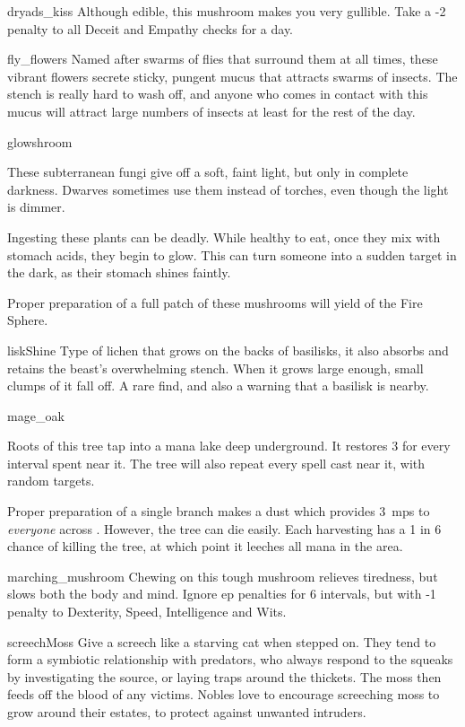 \begin{multicols}{2}
%
  {dryads_kiss}%
  {Although edible, this mushroom makes you very gullible.
  Take a -2 penalty to all Deceit and Empathy checks for a day.}%

%
  {fly_flowers}%
  {Named after swarms of flies that surround them at all times, these vibrant flowers secrete sticky, pungent mucus that attracts swarms of insects.
  The stench is really hard to wash off, and anyone who comes in contact with this mucus will attract large numbers of insects at least for the rest of the day.}%

%
  {glowshroom}%
  {These subterranean fungi give off a soft, faint light, but only in complete darkness.
   Dwarves sometimes use them instead of torches, even though the light is dimmer.

   Ingesting these plants can be deadly.
   While healthy to eat, once they mix with stomach acids, they begin to glow.
   This can turn someone into a sudden target in the dark, as their stomach shines faintly.

   Proper preparation of a full patch of these mushrooms will yield  of the Fire Sphere.
    }

%
  {liskShine}%
  {Type of lichen that grows on the backs of basilisks, it also absorbs and retains the beast's overwhelming stench.
  When it grows large enough, small clumps of it fall off.
  A rare find, and also a warning that a basilisk is nearby.
    }

%
  {mage_oak}%
  {
    Roots of this tree tap into a mana lake deep underground.
    It restores 3  for every \gls{interval} spent near it.
    The tree will also repeat every spell cast near it, with random targets.

    Proper preparation of a single branch makes a dust which provides 3~\glspl{mp} to \emph{everyone} across .
    However, the tree can die easily.
    Each harvesting has a 1 in 6 chance of killing the tree, at which point it leeches all mana in the \gls{area}.
  }%


%
  {marching_mushroom}%
  {
  Chewing on this tough mushroom relieves tiredness, but slows both the body and mind.
    Ignore \gls{ep} penalties for 6 \glspl{interval}, but with -1 penalty to Dexterity, Speed, Intelligence and Wits.
    }

%
  {screechMoss}%
  {
  Give a screech like a starving cat when stepped on.
  They tend to form a symbiotic relationship with predators, who always respond to the squeaks by investigating the source, or laying traps around the thickets.
  The moss then feeds off the blood of any victims.
  Nobles love to encourage screeching moss to grow around their estates, to protect against unwanted intruders.
    }


\end{multicols}
